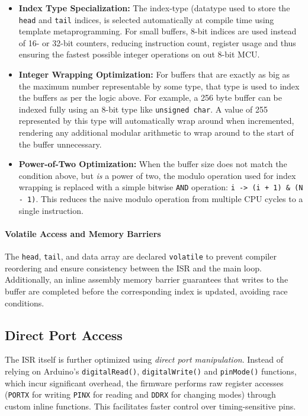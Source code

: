 \begin{itemize}
\item \textbf{Index Type Specialization:} The index-type (datatype used to store the \texttt{head} and \texttt{tail} indices, is selected automatically at compile time using template metaprogramming. For small buffers, 8-bit indices are used instead of 16- or 32-bit counters, reducing instruction count, register usage and thus ensuring the fastest possible integer operations on out 8-bit MCU.
\item \textbf{Integer Wrapping Optimization:} For buffers that are exactly as big as the maximum number representable by some type, that type is used to index the buffers as per the logic above. For example, a 256 byte buffer can be indexed fully using an 8-bit type like \texttt{unsigned char}. A value of 255 represented by this type will automatically wrap around when incremented, rendering any additional modular arithmetic to wrap around to the start of the buffer unnecessary.
\item \textbf{Power-of-Two Optimization:} When the buffer size does not match the condition above, but \emph{is} a power of two, the modulo operation used for index wrapping is replaced with a simple bitwise \texttt{AND} operation: \texttt{i -> (i + 1) \& (N - 1)}. This reduces the naive modulo operation from multiple CPU cycles to a single instruction.
\end{itemize}

\paragraph{Volatile Access and Memory Barriers} The \texttt{head}, \texttt{tail}, and data array are declared \texttt{volatile} to prevent compiler reordering and ensure consistency between the ISR and the main loop. Additionally, an inline assembly memory barrier guarantees that writes to the buffer are completed before the corresponding index is updated, avoiding race conditions.

\subsection{Direct Port Access} The ISR itself is further optimized using \emph{direct port manipulation}. Instead of relying on Arduino’s \texttt{digitalRead()}, \texttt{digitalWrite()} and \texttt{pinMode()} functions, which incur significant overhead, the firmware performs raw register accesses (\texttt{PORTX} for writing \texttt{PINX} for reading and \texttt{DDRX} for changing modes) through custom inline functions. This facilitates faster control over timing-sensitive pins.

